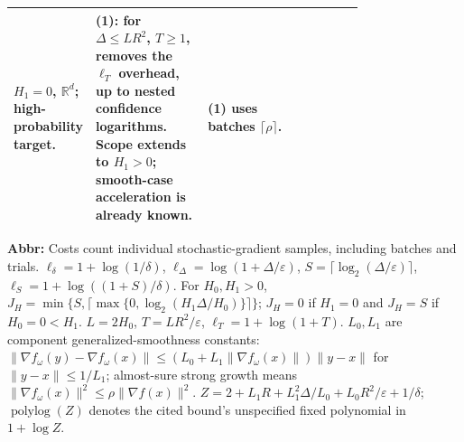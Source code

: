 \begin{table}[tp]
\begin{threeparttable}
\begin{tabularx}{\linewidth}{@{}>{\raggedright\arraybackslash}p{0.20\linewidth}>{\raggedright\arraybackslash}p{0.32\linewidth}>{\raggedright\arraybackslash}p{0.25\linewidth}>{\raggedright\arraybackslash}X@{}}
$H_1=0$, $\mathbb R^d$; high-probability target.
& \textbf{(1)}: for $\Delta\le LR^2$, $T\ge1$, removes the $\ell_T$ overhead, up to nested confidence logarithms. Scope extends to $H_1>0$; smooth-case acceleration is already known.
& \textbf{(1)} uses batches $\lceil\rho\rceil$. \\
\bottomrule
\end{tabularx}
\begin{tablenotes}[flushleft]\footnotesize
\item[] \textbf{Abbr:} Costs count individual stochastic-gradient samples, including batches and trials. $\ell_\delta=1+\log(1/\delta)$, $\ell_\Delta=\log(1+\Delta/\varepsilon)$, $S=\lceil\log_2(\Delta/\varepsilon)\rceil$, $\ell_S=1+\log((1+S)/\delta)$. For $H_0,H_1>0$, $J_H=\min\{S,\lceil\max\{0,\log_2(H_1\Delta/H_0)\}\rceil\}$; $J_H=0$ if $H_1=0$ and $J_H=S$ if $H_0=0<H_1$. $L=2H_0$, $T=LR^2/\varepsilon$, $\ell_T=1+\log(1+T)$. $L_0,L_1$ are component generalized-smoothness constants: $\|\nabla f_\omega(y)-\nabla f_\omega(x)\|\le(L_0+L_1\|\nabla f_\omega(x)\|)\|y-x\|$ for $\|y-x\|\le1/L_1$; almost-sure strong growth means $\|\nabla f_\omega(x)\|^2\le\rho\|\nabla f(x)\|^2$. $Z=2+L_1R+L_1^2\Delta/L_0+L_0R^2/\varepsilon+1/\delta$; $\operatorname{polylog}(Z)$ denotes the cited bound's unspecified fixed polynomial in $1+\log Z$.
\end{tablenotes}
\end{threeparttable}
\end{table}
\clearpage
